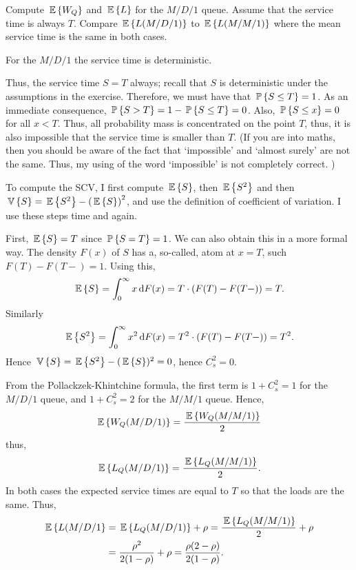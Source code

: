 \begin{question}
  Compute $\E{W_Q}$ and $\E L$ for the $M/D/1$ queue. Assume that the
  service time is always $T$. Compare $\E{L(M/D/1)}$ to $\E{L(M/M/1)}$
  where the mean service time is the same in both cases.
\begin{solution}
  For the $M/D/1$ the service time is deterministic. 

  Thus, the service time $S=T$ always; recall that $S$ is
  deterministic under the assumptions in the exercise. Therefore, we
  must have that $\P{S\leq T} = 1$. As an immediate consequence,
  $\P{S>T} = 1-\P{S\leq T} = 0$. Also, $\P{S \leq x} = 0$ for all
  $x<T$. Thus, all probability mass is concentrated on the point $T$,
  thus, it is also impossible that the service time is smaller than
  $T$.  (If you are into maths, then you should be aware of the fact
  that `impossible' and `almost surely' are not the same. Thus, my
  using of the word `impossible' is not completely correct. )

  To compute the SCV, I first compute $\E S$, then $\E{S^2}$ and then
  $\V S = \E{S^2} - \left(\E S\right)^2$, and use the definition of
  coefficient of variation. I use these steps time and again.

  First, $\E S = T$ since $\P{S=T} =1$. We can also obtain this in a
  more formal way. The density $F(x)$ of $S$ has a, so-called, atom at
  $x=T$, such $F(T) - F(T-) =1$.  Using this,
  \begin{equation*}
    \E S = \int_0^\infty x \d F(x) = T\cdot (F(T)-F(T-)) = T.
  \end{equation*}
Similarly
\begin{equation*}
\E{S^2} = \int_0^\infty x^2 \d F(x) = T^2\cdot (F(T)-F(T-)) = T^2.
\end{equation*}
Hence $\V S = \E{S^2} - (\E S)^2 = 0$, hence $C_s^2 = 0$.

From the Pollackzek-Khintchine formula, the first term is $1+C_s^2=1$ for the $M/D/1$ queue, and $1+C_s^2=2$ for the $M/M/1$ queue. Hence, 
  \begin{equation*}
\E{W_Q(M/D/1)} = \frac{\E{W_Q(M/M/1)}}2
  \end{equation*}
thus, 
\begin{equation*}
 \E{L_Q(M/D/1)} = \frac{\E{L_Q(M/M/1)}}2.    
\end{equation*}
In both cases the expected service times are equal to $T$ so that the loads are the same. Thus, 
\begin{equation*}
  \begin{split}
 \E{L(M/D/1} &= \E{L_Q(M/D/1)} +\rho = \frac{\E{L_Q(M/M/1)}}2 + \rho \\
&= \frac{\rho^2}{2(1-\rho)} + \rho=\frac{\rho(2-\rho)} {2(1-\rho)}.
  \end{split}
\end{equation*}
\end{solution}
\end{question}

